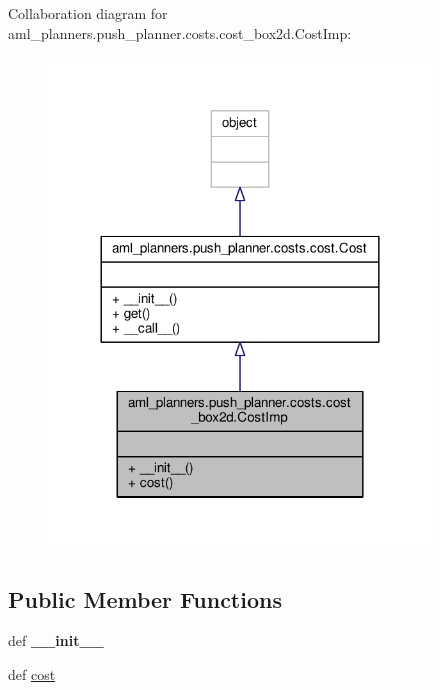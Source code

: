 Collaboration diagram for aml\-\_\-planners.\-push\-\_\-planner.\-costs.\-cost\-\_\-box2d.\-Cost\-Imp\-:\nopagebreak
\begin{figure}[H]
\begin{center}
\leavevmode
\includegraphics[width=288pt]{classaml__planners_1_1push__planner_1_1costs_1_1cost__box2d_1_1_cost_imp__coll__graph}
\end{center}
\end{figure}
\subsection*{Public Member Functions}
\begin{DoxyCompactItemize}
\item 
\hypertarget{classaml__planners_1_1push__planner_1_1costs_1_1cost__box2d_1_1_cost_imp_a81315a7c3e7d482f0a8acc03b0122683}{def {\bfseries \-\_\-\-\_\-init\-\_\-\-\_\-}}\label{classaml__planners_1_1push__planner_1_1costs_1_1cost__box2d_1_1_cost_imp_a81315a7c3e7d482f0a8acc03b0122683}

\item 
def \hyperlink{classaml__planners_1_1push__planner_1_1costs_1_1cost__box2d_1_1_cost_imp_ae0609d38535dfb4456debd1081211bb1}{cost}
\end{DoxyCompactItemize}


